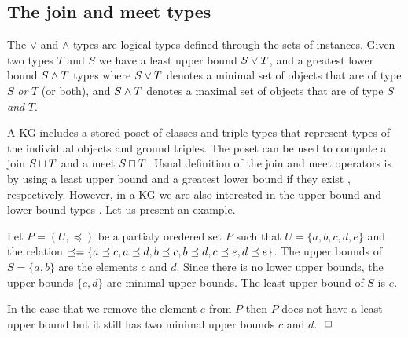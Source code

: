 \documentclass[runningheads]{llncs}
\newcommand{\I}{{\cal I}}
\newcommand{\T}{{\cal T}}
\newcommand{\finbox}{\phantom{.}\hfill\Box}
\newcommand{\memo}[1]{}
\begin{document}
\memo{
Note that the interpretation of a class $C$ is a set of instances
$\llbracket\/C\rrbracket_\D=\{I\ |\ I\in\I_i\land\/I:C\}$. Further, the
interpretation of a triple type $T$ is the set of ground triples
$\llbracket\/T\rrbracket_\D=\{t\ |\ t\in\T_t\land\/t:T\}$\footnote{Triple
  types $\T_t$ are presented in the following Section
  \ref{sec:triples}.}\cite{Savnik2025}.\\}

\memo{Put together the base types of ground identifiers using $\land$ type.}
\memo{First, the base type of an ground identifier is the $\land$ of all base types.}
\memo{The \emph{base type} of a ground identifier is defined explicitely!}





\subsection{The join and meet types\label{sec:join-meet-types}}

The $\lor$ and $\land$ types are logical types defined through the
sets of instances. Given two types $T$ and $S$ we have a least upper
bound $S\lor\/T$, and a greatest lower bound $S\land\/T$ types where
$S\lor\/T$ denotes a minimal set of objects that are of type $S$
\emph{or} $T$ (or both), and $S\land\/T$ denotes a maximal set of
objects that are of type $S$ \emph{and} $T$.

A KG includes a stored poset of classes and triple types that
represent types of the individual objects and ground triples. The
poset can be used to compute a join $S\sqcup\/T$ and a meet
$S\sqcap\/T$. Usual definition of the join and meet operators is by
using a least upper bound and a greatest lower bound if they exist
\cite{Pierce2002}, respectively. However, in a KG we are also
interested in the upper bound and lower bound types
\cite{DaveyPriestley2002}. Let us present an example.

\begin{example}
  Let $P=(U,\preceq)$ be a partialy oredered set $P$ such that
  $U=\{a,b,c,d,e\}$ and the relation
  $\preceq=\{a\preceq\/c,a\preceq\/d,b\preceq\/c,b\preceq\/d,c\preceq\/e,d\preceq\/e\}$.
  The upper bounds of $S=\{a,b\}$ are the elements $c$ and $d$. Since
  there is no lower upper bounds, the upper bounds $\{c,d\}$ are
  minimal upper bounds. The least upper bound of $S$ is $e$.

  In the case that we remove the element $e$ from $P$ then $P$ does
  not have a least upper bound but it still has two minimal upper
  bounds $c$ and $d$. $\finbox$
\end{example}
\end{document}
